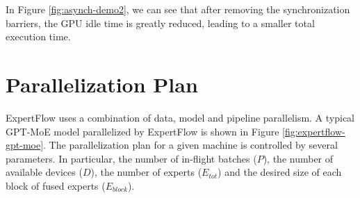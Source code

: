 In Figure \ref{fig:asynch-demo2}, we can see that after removing the synchronization barriers, the GPU idle time is greatly reduced, leading to a smaller total execution time. 

\section{Parallelization Plan}\label{design-parallelization}
ExpertFlow uses a combination of data, model and pipeline parallelism. A typical GPT-MoE model parallelized by ExpertFlow is shown in Figure \ref{fig:expertflow-gpt-moe}.
The parallelization plan for a given machine is controlled by several parameters. In particular, the number of in-flight batches ($P$), the number of available devices ($D$), the number of experts ($E_{tot}$) and the desired size of each block of fused experts ($E_{block}$).


